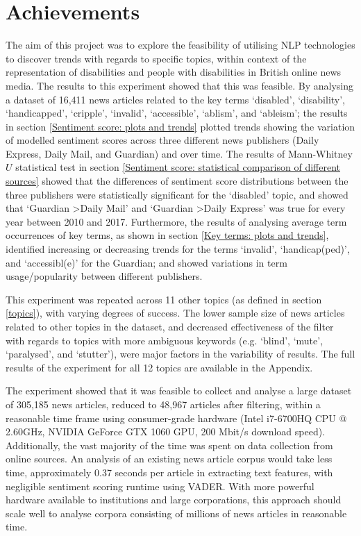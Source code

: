 \documentclass{report}
\begin{document}
\section{Achievements} \label{Achievements}

The aim of this project was to explore the feasibility of utilising NLP technologies to discover trends with regards to specific topics, within context of the representation of disabilities and people with disabilities in British online news media.
The results to this experiment showed that this was feasible.
By analysing a dataset of 16,411 news articles related to the key terms `disabled', `disability', `handicapped', `cripple', `invalid', `accessible', `ablism', and `ableism'; the results in section \ref{Sentiment score: plots and trends} plotted trends showing the variation of modelled sentiment scores across three different news publishers (Daily Express, Daily Mail, and Guardian) and over time.
The results of Mann-Whitney $U$ statistical test in section \ref{Sentiment score: statistical comparison of different sources} showed that the differences of sentiment score distributions between the three publishers were statistically significant for the `disabled' topic, and showed that `Guardian \textgreater\space Daily Mail' and `Guardian \textgreater\space Daily Express' was true for every year between 2010 and 2017.
Furthermore, the results of analysing average term occurrences of key terms, as shown in section \ref{Key terms: plots and trends}, identified increasing or decreasing trends for the terms `invalid', `handicap(ped)', and `accessibl(e)' for the Guardian; and showed variations in term usage/popularity between different publishers.

This experiment was repeated across 11 other topics (as defined in section \ref{topics}), with varying degrees of success. 
The lower sample size of news articles related to other topics in the dataset, and decreased effectiveness of the filter with regards to topics with more ambiguous keywords (e.g. `blind', `mute', `paralysed', and `stutter'), were major factors in the variability of results.
The full results of the experiment for all 12 topics are available in the Appendix.
 
The experiment showed that it was feasible to collect and analyse a large dataset of 305,185 news articles, reduced to 48,967 articles after filtering, within a reasonable time frame using consumer-grade hardware (Intel i7-6700HQ CPU @ 2.60GHz, NVIDIA GeForce GTX 1060 GPU, 200 Mbit/s download speed).
Additionally, the vast majority of the time was spent on data collection from online sources.
An analysis of an existing news article corpus would take less time, approximately 0.37 seconds per article in extracting text features, with negligible sentiment scoring runtime using VADER.
With more powerful hardware available to institutions and large corporations, this approach should scale well to analyse corpora consisting of millions of news articles in reasonable time.
\end{document}
